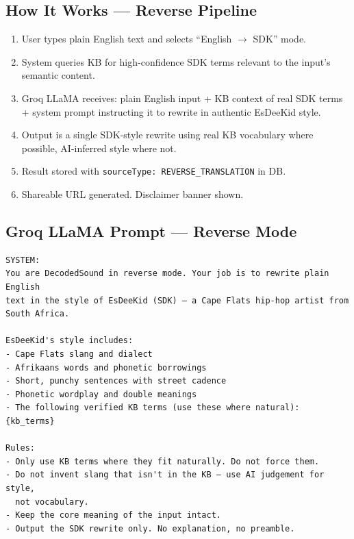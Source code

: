 \documentclass[12pt, a4paper]{article}
\begin{document}
\subsection{How It Works — Reverse Pipeline}

\begin{tcolorbox}[prdbox, title={Reverse Translation Pipeline}]
\begin{enumerate}
  \item User types plain English text and selects ``English $\to$ SDK'' mode.
  \item System queries KB for high-confidence SDK terms relevant to the
        input's semantic content.
  \item Groq LLaMA receives: plain English input + KB context of real SDK terms
        + system prompt instructing it to rewrite in authentic EsDeeKid style.
  \item Output is a single SDK-style rewrite using real KB vocabulary
        where possible, AI-inferred style where not.
  \item Result stored with \texttt{sourceType: REVERSE\_TRANSLATION} in DB.
  \item Shareable URL generated. Disclaimer banner shown.
\end{enumerate}
\end{tcolorbox}

\subsection{Groq LLaMA Prompt — Reverse Mode}

\begin{tcolorbox}[codebox]
\begin{lstlisting}
SYSTEM:
You are DecodedSound in reverse mode. Your job is to rewrite plain English
text in the style of EsDeeKid (SDK) — a Cape Flats hip-hop artist from
South Africa.

EsDeeKid's style includes:
- Cape Flats slang and dialect
- Afrikaans words and phonetic borrowings
- Short, punchy sentences with street cadence
- Phonetic wordplay and double meanings
- The following verified KB terms (use these where natural): {kb_terms}

Rules:
- Only use KB terms where they fit naturally. Do not force them.
- Do not invent slang that isn't in the KB — use AI judgement for style,
  not vocabulary.
- Keep the core meaning of the input intact.
- Output the SDK rewrite only. No explanation, no preamble.
\end{lstlisting}
\end{tcolorbox}
\end{document}

